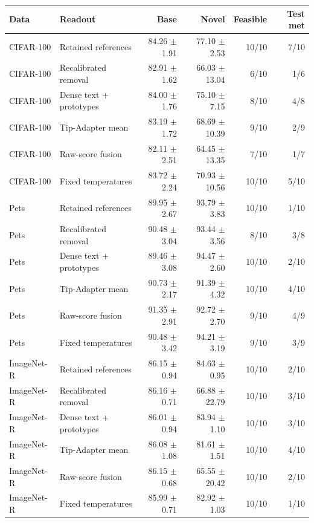 \begin{tabular}{llrrrr}
\toprule
Data & Readout & Base & Novel & Feasible & Test met \\
\midrule
CIFAR-100 & Retained references & 84.26 $\pm$ 1.91 & 77.10 $\pm$ 2.53 & 10/10 & 7/10 \\
CIFAR-100 & Recalibrated removal & 82.91 $\pm$ 1.62 & 66.03 $\pm$ 13.04 & 6/10 & 1/6 \\
CIFAR-100 & Dense text + prototypes & 84.00 $\pm$ 1.76 & 75.10 $\pm$ 7.15 & 8/10 & 4/8 \\
CIFAR-100 & Tip-Adapter mean & 83.19 $\pm$ 1.72 & 68.69 $\pm$ 10.39 & 9/10 & 2/9 \\
CIFAR-100 & Raw-score fusion & 82.11 $\pm$ 2.51 & 64.45 $\pm$ 13.35 & 7/10 & 1/7 \\
CIFAR-100 & Fixed temperatures & 83.72 $\pm$ 2.24 & 70.93 $\pm$ 10.56 & 10/10 & 5/10 \\
\midrule
Pets & Retained references & 89.95 $\pm$ 2.67 & 93.79 $\pm$ 3.83 & 10/10 & 1/10 \\
Pets & Recalibrated removal & 90.48 $\pm$ 3.04 & 93.44 $\pm$ 3.56 & 8/10 & 3/8 \\
Pets & Dense text + prototypes & 89.46 $\pm$ 3.08 & 94.47 $\pm$ 2.60 & 10/10 & 2/10 \\
Pets & Tip-Adapter mean & 90.73 $\pm$ 2.17 & 91.39 $\pm$ 4.32 & 10/10 & 4/10 \\
Pets & Raw-score fusion & 91.35 $\pm$ 2.91 & 92.72 $\pm$ 2.70 & 9/10 & 4/9 \\
Pets & Fixed temperatures & 90.48 $\pm$ 3.42 & 94.21 $\pm$ 3.19 & 9/10 & 3/9 \\
\midrule
ImageNet-R & Retained references & 86.15 $\pm$ 0.94 & 84.63 $\pm$ 0.95 & 10/10 & 2/10 \\
ImageNet-R & Recalibrated removal & 86.16 $\pm$ 0.71 & 66.88 $\pm$ 22.79 & 10/10 & 3/10 \\
ImageNet-R & Dense text + prototypes & 86.01 $\pm$ 0.94 & 83.94 $\pm$ 1.10 & 10/10 & 3/10 \\
ImageNet-R & Tip-Adapter mean & 86.08 $\pm$ 1.08 & 81.61 $\pm$ 1.51 & 10/10 & 4/10 \\
ImageNet-R & Raw-score fusion & 86.15 $\pm$ 0.68 & 65.55 $\pm$ 20.42 & 10/10 & 2/10 \\
ImageNet-R & Fixed temperatures & 85.99 $\pm$ 0.71 & 82.92 $\pm$ 1.03 & 10/10 & 1/10 \\
\bottomrule
\end{tabular}
